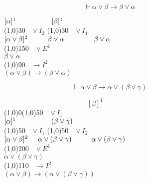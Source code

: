 \documentclass{article}
\theoremstyle{break}
\theoremstyle{break}
\theoremstyle{break}
\theoremstyle{break}
\begin{document}
\begin{figure}[H]
  \begin{exercise}
    \[
      \vdash \alpha \vee \beta \to \beta \vee \alpha
    \] 
    \begin{center}
      \hspace{2.2cm}\( [\alpha]^1 \hspace{1.8cm} [\beta]^1 \) \\
      \hspace{3cm}\line(1,0){30}\(\;\;\; \vee I_2 \) \hspace{0.2cm}\line(1,0){30}\(\;\;\; \vee I_1 \)\\  
      \( [\alpha \vee \beta]^2 \hspace{1cm} \beta \vee \alpha \hspace{1.5cm} \beta \vee \alpha \) \\
      \hspace{0.9cm}\line(1,0){150}\(\;\;\; \vee E^1 \)\\  
      \( \beta \vee \alpha \)\\
      \hspace{0.9cm}\line(1,0){90}\(\;\;\; \to I^2 \)\\  
      \( (\alpha \vee \beta) \to (\beta \vee \alpha) \) 
    \end{center}

  \end{exercise}
\end{figure}

\begin{figure}[H]
  \begin{exercise}
    \[
      \vdash \alpha \vee \beta \to \alpha \vee (\beta \vee \gamma)
    \] 
    \begin{center}
      \( \hspace{5cm} [\beta]^1 \)\\ 
      \line(1,0){0}\hspace{6cm}\line(1,0){50}\(\;\;\; \vee I_1 \)\\
      \hspace{2.2cm}\( [\alpha]^1 \hspace{1.8cm} (\beta \vee \gamma) \) \\
      \hspace{3cm}\line(1,0){50}\(\;\;\; \vee I_1 \) \hspace{0.2cm}\line(1,0){50}\(\;\;\; \vee I_2 \)\\  
      \( [\alpha \vee \beta]^2 \hspace{0.5cm} \alpha \vee (\beta \vee \gamma) \hspace{1cm} \alpha \vee (\beta \vee \gamma) \) \\
      \hspace{0.9cm}\line(1,0){200}\(\;\;\; \vee E^1 \)\\  
      \( \alpha \vee (\beta \vee \gamma)\)\\
      \hspace{0.9cm}\line(1,0){110}\(\;\;\; \to I^2 \)\\  
      \( (\alpha \vee \beta) \to (\alpha \vee (\beta \vee \gamma)) \) 
    \end{center}
  \end{exercise}
\end{figure}
\end{document}
